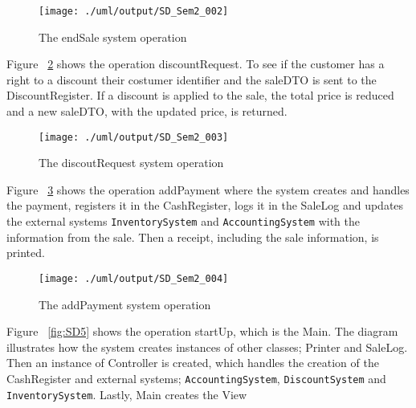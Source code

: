 \documentclass[a4paper]{scrreprt}
\begin{document}
\begin{figure}[h]
    \begin{center}
        \texttt{[image: ./uml/output/SD\_Sem2\_002]}
        \caption{The endSale system operation }
        \label{fig:SD2}
    \end{center}
\end{figure}

Figure ~\ref{fig:SD3} shows the operation discountRequest.
To see if the customer has a right to a discount their costumer identifier and the saleDTO is sent to the DiscountRegister.
If a discount is applied to the sale, the total price is reduced and a new saleDTO, with the updated price, is returned.

\begin{figure}[h]
    \begin{center}
        \texttt{[image: ./uml/output/SD\_Sem2\_003]}
        \caption{The discoutRequest system operation }
        \label{fig:SD3}
    \end{center}
\end{figure}

Figure ~\ref{fig:SD4} shows the operation addPayment where the system creates and handles the payment,
registers it in the CashRegister,
logs it in the SaleLog and updates the external systems \texttt{InventorySystem} and
\texttt{AccountingSystem} with the information from the sale.
Then a receipt, including the sale information, is printed.

\begin{figure}[h]
    \begin{center}
        \texttt{[image: ./uml/output/SD\_Sem2\_004]}
        \caption{The addPayment system operation }
        \label{fig:SD4}
    \end{center}
\end{figure}

Figure ~\ref{fig:SD5} shows the operation startUp, which is the Main.
The diagram illustrates how the system creates instances of other classes; Printer and SaleLog.
Then an instance of Controller is created,
which handles the creation of the CashRegister and external systems;
\texttt{AccountingSystem}, \texttt{DiscountSystem} and \texttt{InventorySystem}.
Lastly, Main creates the View
\end{document}
